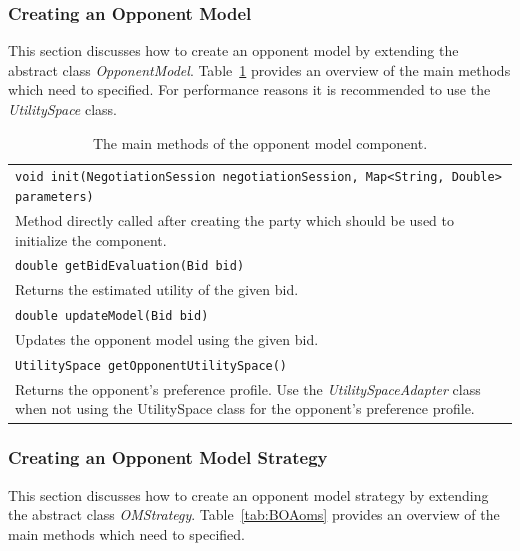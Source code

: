 \documentclass[]{article}
\begin{document}
\subsubsection{Creating an Opponent Model}
This section discusses how to create an opponent model by extending the abstract class \textit{OpponentModel}. Table~\ref{tab:BOAom} provides an overview of the main methods which need to specified. For performance reasons it is recommended to use the \textit{UtilitySpace} class.

\begin{table}[h]
\begin{tabular}{m{}}
\hline
\texttt{void init(NegotiationSession negotiationSession, Map<String, Double> parameters)}\\
Method directly called after creating the party which should be used to initialize the component.\\
\hline
\texttt{double getBidEvaluation(Bid bid)}\\
Returns the estimated utility of the given bid.\\
\hline
\texttt{double updateModel(Bid bid)}\\
Updates the opponent model using the given bid.\\
\hline
\texttt{UtilitySpace getOpponentUtilitySpace()}\\
Returns the opponent's preference profile. Use the \textit{UtilitySpaceAdapter} class when not using the UtilitySpace class for the opponent's preference profile.\\
\hline
\end{tabular}
\caption{The main methods of the opponent model component.}
\label{tab:BOAom}
\end{table}

\subsubsection{Creating an Opponent Model Strategy}
This section discusses how to create an opponent model strategy by extending the abstract class \textit{OMStrategy}. Table~\ref{tab:BOAoms} provides an overview of the main methods which need to specified.
\end{document}
